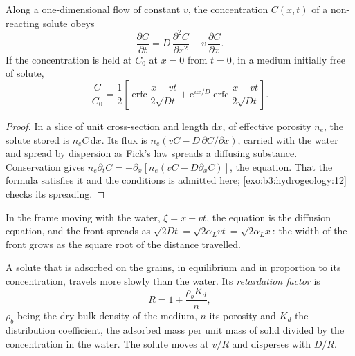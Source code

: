 \begin{theorem}\label{thm:b3:hydrogeology:ade}
Along a one-dimensional flow of constant  $v$, the
concentration $C(x, t)$ of a non-reacting solute obeys
\[
\frac{\partial C}{\partial t} = D\,\frac{\partial^2C}{\partial x^2} -
v\,\frac{\partial C}{\partial x} .
\]
If the concentration is held at $C_0$ at $x = 0$ from $t = 0$, in a medium
initially free of solute,
\[
\frac{C}{C_0} = \frac12\left[\operatorname{erfc}\frac{x - vt}{2\sqrt{Dt}} +
\mathrm e^{vx/D}\operatorname{erfc}\frac{x + vt}{2\sqrt{Dt}}\right] .
\]
\end{theorem}

\begin{proof}
In a slice of unit cross-section and length $\mathrm dx$, of effective
porosity $n_e$, the solute stored is $n_eC\,\mathrm dx$. Its flux is
$n_e(vC - D\,\partial C/\partial x)$, carried with the water and spread by
dispersion as Fick's law spreads a diffusing substance. Conservation gives
$n_e\partial_tC = -\partial_x[n_e(vC - D\partial_xC)]$, the equation. That
the formula satisfies it and the conditions is admitted here;
\cref{exo:b3:hydrogeology:12} checks its spreading.
\end{proof}

In the frame moving with the water, $\xi = x - vt$, the equation is the
diffusion equation, and the front spreads as $\sqrt{2Dt} = \sqrt{2\alpha_L
vt} = \sqrt{2\alpha_Lx}$: the width of the front grows as the square root
of the distance travelled.

\begin{definition}\label{def:b3:hydrogeology:retardation}
A solute that is adsorbed on the grains, in equilibrium and in proportion
to its concentration, travels more slowly than the water. Its
\emph{retardation factor} is
\[
R = 1 + \frac{\rho_bK_d}{n} ,
\]
$\rho_b$ being the dry bulk density of the medium, $n$ its porosity and
$K_d$ the distribution coefficient, the adsorbed mass per unit mass of
solid divided by the concentration in the water. The solute moves at $v/R$
and disperses with $D/R$.
\end{definition}

